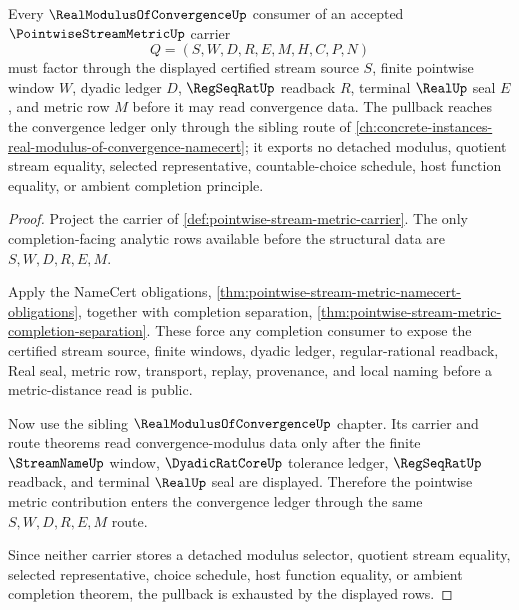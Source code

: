\begin{theorem}
\label{thm:pointwise-stream-metric-modulus-ledger-pullback}
Every $\RealModulusOfConvergenceUp$ consumer of an accepted $\PointwiseStreamMetricUp$ carrier
$$
Q=(S,W,D,R,E,M,H,C,P,N)
$$
must factor through the displayed certified stream source $S$, finite pointwise window $W$, dyadic ledger $D$, $\RegSeqRatUp$ readback $R$, terminal $\RealUp$ seal $E$, and metric row $M$ before it may read convergence data. The pullback reaches the convergence ledger only through the sibling route of \autoref{ch:concrete-instances-real-modulus-of-convergence-namecert}; it exports no detached modulus, quotient stream equality, selected representative, countable-choice schedule, host function equality, or ambient completion principle.
\end{theorem}
\begin{proof}
Project the carrier of \autoref{def:pointwise-stream-metric-carrier}. The only completion-facing analytic rows available before the structural data are $S,W,D,R,E,M$.

Apply the NameCert obligations, \autoref{thm:pointwise-stream-metric-namecert-obligations}, together with completion separation, \autoref{thm:pointwise-stream-metric-completion-separation}. These force any completion consumer to expose the certified stream source, finite windows, dyadic ledger, regular-rational readback, Real seal, metric row, transport, replay, provenance, and local naming before a metric-distance read is public.

Now use the sibling $\RealModulusOfConvergenceUp$ chapter. Its carrier and route theorems read convergence-modulus data only after the finite $\StreamNameUp$ window, $\DyadicRatCoreUp$ tolerance ledger, $\RegSeqRatUp$ readback, and terminal $\RealUp$ seal are displayed. Therefore the pointwise metric contribution enters the convergence ledger through the same $S,W,D,R,E,M$ route.

Since neither carrier stores a detached modulus selector, quotient stream equality, selected representative, choice schedule, host function equality, or ambient completion theorem, the pullback is exhausted by the displayed rows.
\end{proof}

